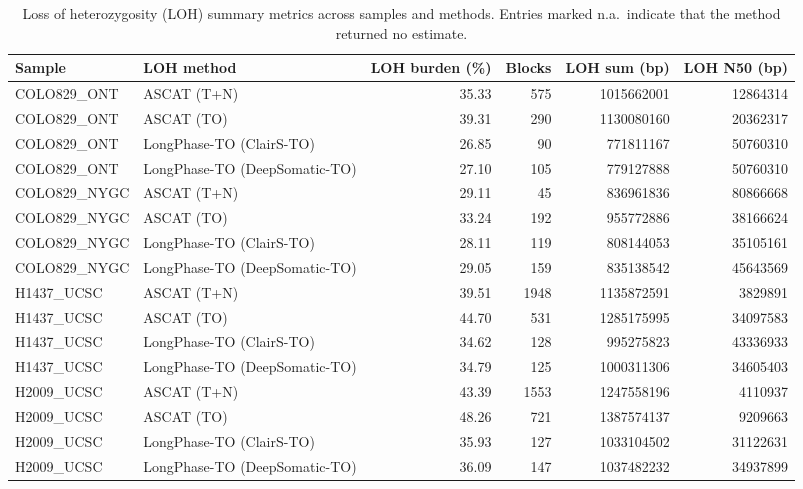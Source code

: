 \documentclass[pdflatex,sn-nature]{sn-jnl}
\begin{document}
\begin{table}[htbp]
  \centering\footnotesize
  \caption[Loss of heterozygosity summary metrics]%
  {Loss of heterozygosity (LOH) summary metrics across samples and methods. Entries marked n.a.\ indicate that the method returned no estimate.}
  \label{tab:loh_summary}
  \begin{tabular}{@{}llrrrr@{}}
    \toprule
    Sample & LOH method & LOH burden (\%) & Blocks & LOH sum (bp) & LOH N50 (bp) \\
    \midrule
    COLO829\_ONT   & ASCAT (T+N)                  & 35.33 & 575  & 1015662001 & 12864314  \\
    COLO829\_ONT   & ASCAT (TO)                   & 39.31 & 290  & 1130080160 & 20362317  \\
    COLO829\_ONT   & LongPhase-TO (ClairS-TO)      & 26.85 &  90  &  771811167 & 50760310  \\
    COLO829\_ONT   & LongPhase-TO (DeepSomatic-TO) & 27.10 & 105  &  779127888 & 50760310  \\
    COLO829\_NYGC  & ASCAT (T+N)                  & 29.11 &  45  &  836961836 & 80866668  \\
    COLO829\_NYGC  & ASCAT (TO)                   & 33.24 & 192  &  955772886 & 38166624  \\
    COLO829\_NYGC  & LongPhase-TO (ClairS-TO)      & 28.11 & 119  &  808144053 & 35105161  \\
    COLO829\_NYGC  & LongPhase-TO (DeepSomatic-TO) & 29.05 & 159  &  835138542 & 45643569 \\
    H1437\_UCSC    & ASCAT (T+N)                  & 39.51 & 1948 & 1135872591 &  3829891  \\
    H1437\_UCSC    & ASCAT (TO)                   & 44.70 & 531  & 1285175995 & 34097583  \\
    H1437\_UCSC    & LongPhase-TO (ClairS-TO)      & 34.62 & 128  &  995275823 & 43336933  \\
    H1437\_UCSC    & LongPhase-TO (DeepSomatic-TO) & 34.79 & 125  & 1000311306 & 34605403  \\
    H2009\_UCSC    & ASCAT (T+N)                  & 43.39 & 1553 & 1247558196 &  4110937  \\
    H2009\_UCSC    & ASCAT (TO)                   & 48.26 & 721  & 1387574137 &  9209663  \\
    H2009\_UCSC    & LongPhase-TO (ClairS-TO)      & 35.93 & 127  & 1033104502 & 31122631  \\
    H2009\_UCSC    & LongPhase-TO (DeepSomatic-TO) & 36.09 & 147  & 1037482232 & 34937899  \\

\end{tabular}
\end{table}
\end{document}
